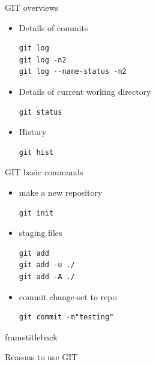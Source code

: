 \begin{frame}[fragile]{GIT overviews}

  \begin{itemize}
  \item Details of commits
\begin{verbatim}
git log
git log -n2
git log --name-status -n2
\end{verbatim}
  \item Details of current working directory
\begin{verbatim}
git status
\end{verbatim}
  \item History
\begin{verbatim}
git hist
\end{verbatim}
{}
  \end{itemize}
\end{frame}




\begin{frame}[fragile]{GIT basic commands}

  \begin{itemize}
  \item make a new repository
\begin{verbatim}
git init
\end{verbatim}
  \item staging files
\begin{verbatim}
git add
git add -u ./
git add -A ./
\end{verbatim}
  \item commit change-set to repo
\begin{verbatim}
git commit -m"testing"
\end{verbatim}
  \end{itemize}
\end{frame}



\begin{frame}
  \begin{beamercolorbox}[sep=1em]{frametitleback}
    \centering
    \begin{Huge}
      {Reasons to use GIT}
    \end{Huge}
  \end{beamercolorbox}

\end{frame}



